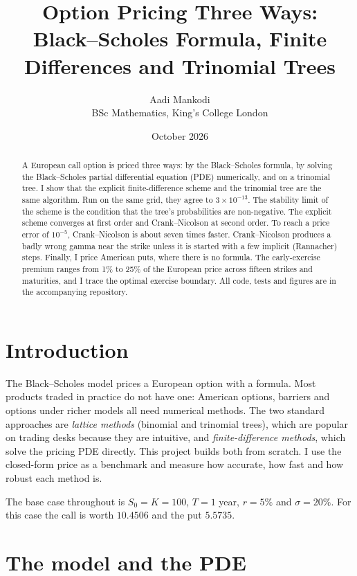 \documentclass[11pt,a4paper]{article}
\title{Option Pricing Three Ways:\\[2pt]
\large Black--Scholes Formula, Finite Differences and Trinomial Trees}
\author{Aadi Mankodi\\ \small BSc Mathematics, King's College London}
\date{October 2026}
\begin{document}
\maketitle

\begin{abstract}
\noindent
A European call option is priced three ways: by the Black--Scholes formula, by
solving the Black--Scholes partial differential equation (PDE) numerically, and on a trinomial
tree. I show that the explicit finite-difference scheme and the trinomial tree are
the same algorithm. Run on the same grid, they agree to $3\times10^{-13}$. The stability limit
of the scheme is the condition that the tree's probabilities are non-negative.
The explicit scheme converges at first order and Crank--Nicolson at second order.
To reach a price error of $10^{-5}$, Crank--Nicolson is about seven times faster.
Crank--Nicolson produces a badly wrong gamma near the strike unless it is started with a few implicit
(Rannacher) steps. Finally, I price American puts, where there is no formula. The early-exercise
premium ranges from 1\% to 25\% of the European price across fifteen strikes and maturities,
and I trace the optimal exercise boundary. All code, tests and figures are in the accompanying
repository.
\end{abstract}

\section{Introduction}

The Black--Scholes model prices a European option with a formula. Most products traded in practice do not
have one: American options, barriers and options under richer models all need numerical
methods. The two standard approaches are \emph{lattice methods} (binomial and trinomial trees),
which are popular on trading desks because they are intuitive, and \emph{finite-difference
methods}, which solve the pricing PDE directly. This project builds both from scratch. I use
the closed-form price as a benchmark and measure how accurate, how fast and how robust each
method is.

The base case throughout is $S_0=K=100$, $T=1$ year, $r=5\%$ and $\sigma=20\%$. For this case the
call is worth $10.4506$ and the put $5.5735$.

\section{The model and the PDE}
\end{document}
